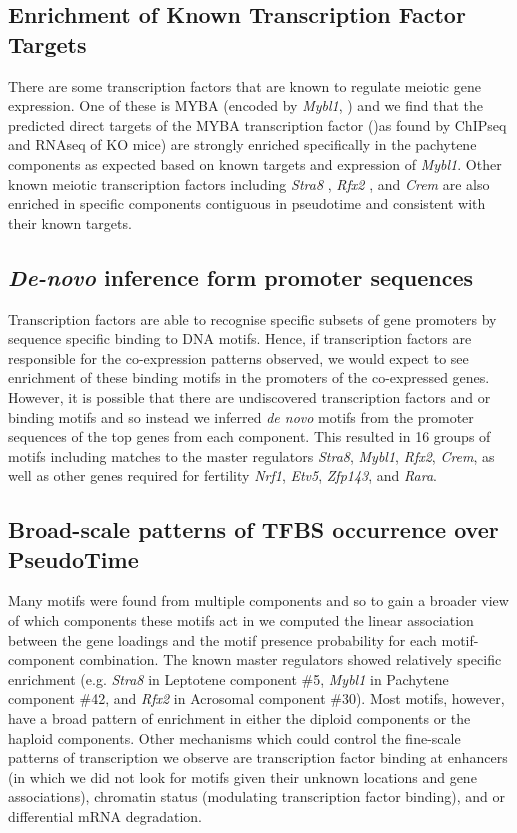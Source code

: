 \subsection{Enrichment of Known Transcription Factor Targets}
There are some transcription factors that are known to regulate meiotic gene expression. One of these is MYBA (encoded by \textit{Mybl1}, \cite{Bolcun-Filas2011AMYB}) and we find that the predicted direct targets of the MYBA transcription factor ()as found by ChIPseq and RNAseq of KO mice) are strongly enriched specifically in the pachytene components as expected based on known targets and expression of \textit{Mybl1}. Other known meiotic transcription factors including \textit{Stra8} \parencite{Kojima2019Amplification}, \textit{Rfx2} \parencite{Kistler2015RFX2}, and \textit{Crem} \parencite{Nantel1996Spermiogenesis} are also enriched in specific components contiguous in pseudotime and consistent with their known targets.


\subsection{\emph{De-novo} inference form promoter sequences}
Transcription factors are able to recognise specific subsets of gene promoters by sequence specific binding to DNA motifs. Hence, if transcription factors are responsible for the co-expression patterns observed, we would expect to see enrichment of these binding motifs in the promoters of the co-expressed genes. However, it is possible that there are undiscovered transcription factors and or binding motifs and so instead we inferred \textit{de novo} motifs from the promoter sequences of the top genes from each component. This resulted in 16 groups of motifs including matches to the master regulators \textit{Stra8}, \textit{Mybl1}, \textit{Rfx2}, \textit{Crem}, as well as other genes required for fertility \textit{Nrf1}, \textit{Etv5}, \textit{Zfp143}, and \textit{Rara}.

\subsection{Broad-scale patterns of TFBS occurrence over PseudoTime}
Many motifs were found from multiple components and so to gain a broader view of which components these motifs act in we computed the linear association between the gene loadings and the motif presence probability for each motif-component combination. The known master regulators showed relatively specific enrichment (e.g. \textit{Stra8} in Leptotene component \#5, \textit{Mybl1} in Pachytene component \#42, and \textit{Rfx2} in Acrosomal component \#30). Most motifs, however, have a broad pattern of enrichment in either the diploid components or the haploid components. Other mechanisms which could control the fine-scale patterns of transcription we observe are transcription factor binding at enhancers (in which we did not look for motifs given their unknown locations and gene associations), chromatin status (modulating transcription factor binding), and or differential mRNA degradation.

